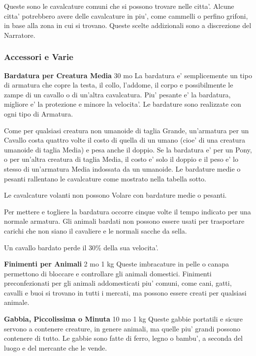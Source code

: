 \documentclass[a4paper,11pt,twoside,openany]{dndbook}
\begin{document}
{Queste sono le cavalcature comuni che si possono trovare nelle citta'. Alcune citta' potrebbero avere delle cavalcature in piu', come cammelli o perfino grifoni, in base alla zona in cui si trovano. Queste scelte addizionali sono a discrezione del Narratore.

\subsubsection{Accessori e Varie}

\label{accessori-e-varie}

\textbf{Bardatura per Creatura Media} 30 mo La bardatura e' semplicemente un tipo di armatura che copre la testa, il collo, l'addome, il corpo e possibilmente le zampe di un cavallo o di un'altra cavalcatura. Piu' pesante e' la bardatura, migliore e' la protezione e minore la velocita'. Le bardature sono realizzate con ogni tipo di Armatura.

Come per qualsiasi creatura non umanoide di taglia Grande, un'armatura per un Cavallo costa quattro volte il costo di quella di un umano (cioe' di una creatura umanoide di taglia Media) e pesa anche il doppio. Se la bardatura e' per un Pony, o per un'altra creatura di taglia Media, il costo e' solo il doppio e il peso e' lo stesso di un'armatura Media indossata da un umanoide. Le bardature medie o pesanti rallentano le cavalcature come mostrato nella tabella sotto.

Le cavalcature volanti non possono Volare con bardature medie o pesanti.

Per mettere e togliere la bardatura occorre cinque volte il tempo indicato per una normale armatura. Gli animali bardati non possono essere usati per trasportare carichi che non siano il cavaliere e le normali sacche da sella.

Un cavallo bardato perde il 30\% della sua velocita'.

\textbf{Finimenti per Animali} 2 mo 1 kg Queste imbracature in pelle o canapa permettono di bloccare e controllare gli animali domestici. Finimenti preconfezionati per gli animali addomesticati piu' comuni, come cani, gatti, cavalli e buoi si trovano in tutti i mercati, ma possono essere creati per qualsiasi animale.

\textbf{Gabbia, Piccolissima o Minuta} 10 mo 1 kg Queste gabbie portatili e sicure servono a contenere creature, in genere animali, ma quelle piu' grandi possono contenere di tutto. Le gabbie sono fatte di ferro, legno o bambu', a seconda del luogo e del mercante che le vende. 

}
\end{document}
